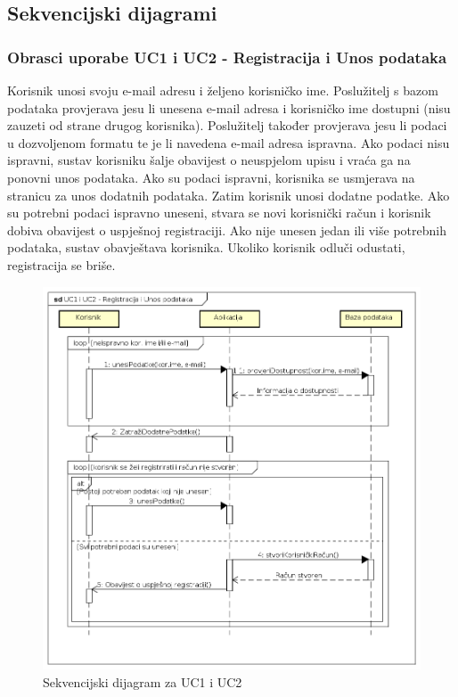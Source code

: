 			\subsection{Sekvencijski dijagrami}
				
				\subsubsection{Obrasci uporabe UC1 i UC2 - Registracija i Unos podataka}
				
					Korisnik unosi svoju e-mail adresu i željeno korisničko ime. Poslužitelj s bazom podataka provjerava jesu li unesena e-mail adresa i korisničko ime dostupni (nisu zauzeti od strane drugog korisnika). Poslužitelj također provjerava jesu li podaci u dozvoljenom formatu te je li navedena e-mail adresa ispravna. Ako podaci nisu ispravni, sustav korisniku šalje obavijest o neuspjelom upisu i vraća ga na ponovni unos podataka. Ako su podaci ispravni, korisnika se usmjerava na stranicu za unos dodatnih podataka. \newline
					Zatim korisnik unosi dodatne podatke. Ako su potrebni podaci ispravno uneseni, stvara se novi korisnički račun i korisnik dobiva obavijest o uspješnoj registraciji. Ako nije unesen jedan ili više potrebnih podataka, sustav obavještava korisnika. Ukoliko korisnik odluči odustati, registracija se briše.
				\eject
				
					\begin{figure}[h]
						\includegraphics[scale=0.63]{dijagrami/UML_sd_UC1UC2.PNG}
						\centering
						\caption{Sekvencijski dijagram za UC1 i UC2}
						\label{fig:UML_sd_UC1UC2}
					\end{figure}
				
